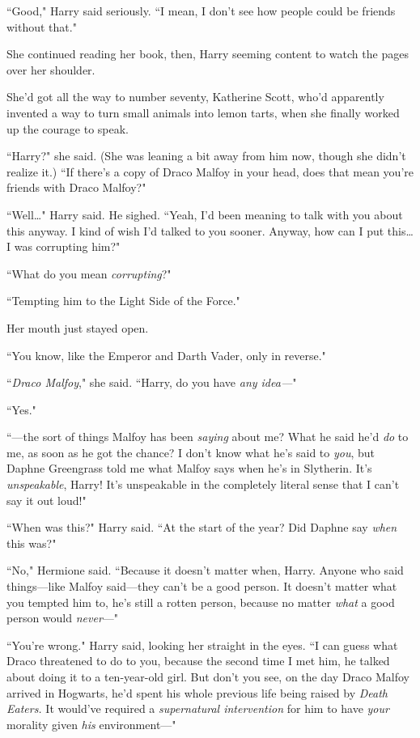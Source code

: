 ``Good," Harry said seriously. ``I mean, I don't see how people could be friends without that."

She continued reading her book, then, Harry seeming content to watch the pages over her shoulder.

She'd got all the way to number seventy, Katherine Scott, who'd apparently invented a way to turn small animals into lemon tarts, when she finally worked up the courage to speak.

``Harry?" she said. (She was leaning a bit away from him now, though she didn't realize it.) ``If there's a copy of Draco Malfoy in your head, does that mean you're friends with Draco Malfoy?"

``Well{\ldots}" Harry said. He sighed. ``Yeah, I'd been meaning to talk with you about this anyway. I kind of wish I'd talked to you sooner. Anyway, how can I put this{\ldots} I was corrupting him?"

``What do you mean \emph{corrupting}?"

``Tempting him to the Light Side of the Force."

Her mouth just stayed open.

``You know, like the Emperor and Darth Vader, only in reverse."

``\emph{Draco Malfoy}," she said. ``Harry, do you have \emph{any idea—}"

``Yes."

``—the sort of things Malfoy has been \emph{saying} about me? What he said he'd \emph{do} to me, as soon as he got the chance? I don't know what he's said to \emph{you}, but Daphne Greengrass told me what Malfoy says when he's in Slytherin. It's \emph{unspeakable}, Harry! It's unspeakable in the completely literal sense that I can't say it out loud!"

``When was this?" Harry said. ``At the start of the year? Did Daphne say \emph{when} this was?"

``No," Hermione said. ``Because it doesn't matter when, Harry. Anyone who said things—like Malfoy said—they can't be a good person. It doesn't matter what you tempted him to, he's still a rotten person, because no matter \emph{what} a good person would \emph{never}—"

``You're wrong." Harry said, looking her straight in the eyes. ``I can guess what Draco threatened to do to you, because the second time I met him, he talked about doing it to a ten-year-old girl. But don't you see, on the day Draco Malfoy arrived in Hogwarts, he'd spent his whole previous life being raised by \emph{Death Eaters.} It would've required a \emph{supernatural intervention} for him to have \emph{your} morality given \emph{his} environment—"

